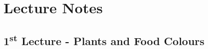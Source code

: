 \chapter{Lecture Notes}
\setlength{\headheight}{12.71342pt}
\addtolength{\topmargin}{-0.71342pt}

\section*{1\texorpdfstring{\textsuperscript{st}}{st} Lecture - Plants and Food Colours}
